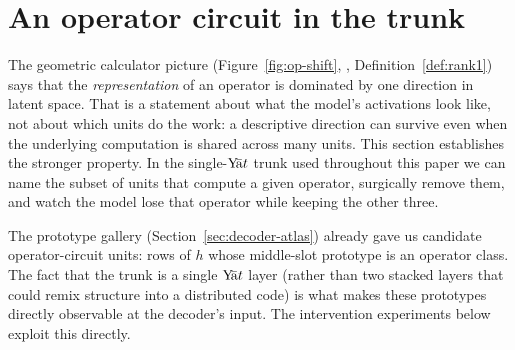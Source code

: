 \documentclass[11pt]{article}
\theoremstyle{papsty}
\newcommand{\yat}{$\textnormal{Y}\!\bar{\text{a}}t$}
\begin{document}
\section{An operator circuit in the trunk}
\label{sec:intervene}

The geometric calculator picture
(Figure~\ref{fig:op-shift}, \citealt{goodfire2025geometric},
Definition~\ref{def:rank1}) says that the \emph{representation} of an
operator is dominated by one direction in latent space. That is a
statement about what the model's activations look like, not about which
units do the work: a descriptive direction can survive even when the
underlying computation is shared across many units. This section
establishes the stronger property. In the single-\yat{} trunk used
throughout this paper we can name the subset of units that compute a
given operator, surgically remove them, and watch the model lose that
operator while keeping the other three.

The prototype gallery (Section~\ref{sec:decoder-atlas}) already gave us
candidate operator-circuit units: rows of $h$ whose middle-slot
prototype is an operator class. The fact that the trunk is a single
\yat{} layer (rather than two stacked layers that could remix structure
into a distributed code) is what makes these prototypes directly
observable at the decoder's input. The intervention experiments below
exploit this directly.
\end{document}
